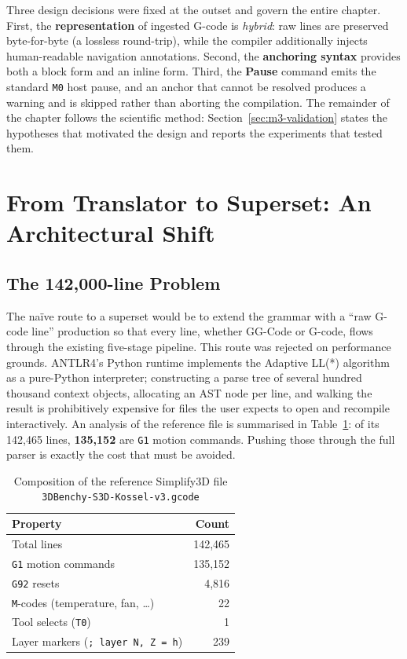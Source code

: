 Three design decisions were fixed at the outset and govern the entire chapter. First, the \textbf{representation} of ingested G-code is \emph{hybrid}: raw lines are preserved byte-for-byte (a lossless round-trip), while the compiler additionally injects human-readable navigation annotations. Second, the \textbf{anchoring syntax} provides both a block form and an inline form. Third, the \textbf{Pause} command emits the standard \texttt{M0} host pause, and an anchor that cannot be resolved produces a warning and is skipped rather than aborting the compilation. The remainder of the chapter follows the scientific method: Section~\ref{sec:m3-validation} states the hypotheses that motivated the design and reports the experiments that tested them.

\section{From Translator to Superset: An Architectural Shift}

\subsection*{The 142{,}000-line Problem}

The naïve route to a superset would be to extend the grammar with a ``raw G-code line'' production so that every line, whether GG-Code or G-code, flows through the existing five-stage pipeline. This route was rejected on performance grounds. ANTLR4's Python runtime implements the Adaptive LL(*) algorithm as a pure-Python interpreter; constructing a parse tree of several hundred thousand context objects, allocating an AST node per line, and walking the result is prohibitively expensive for files the user expects to open and recompile interactively. An analysis of the reference file is summarised in Table~\ref{tab:benchy-stats}: of its 142{,}465 lines, \textbf{135{,}152} are \texttt{G1} motion commands. Pushing those through the full parser is exactly the cost that must be avoided.

\begin{table}[H]
\centering
\begin{tabular}{|l|r|}
\hline
\textbf{Property} & \textbf{Count} \\
\hline
Total lines & 142{,}465 \\
\texttt{G1} motion commands & 135{,}152 \\
\texttt{G92} resets & 4{,}816 \\
\texttt{M}-codes (temperature, fan, \ldots) & 22 \\
Tool selects (\texttt{T0}) & 1 \\
Layer markers (\texttt{; layer N, Z = h}) & 239 \\
\hline
\end{tabular}
\caption{Composition of the reference Simplify3D file \texttt{3DBenchy-S3D-Kossel-v3.gcode}}
\label{tab:benchy-stats}
\end{table}

